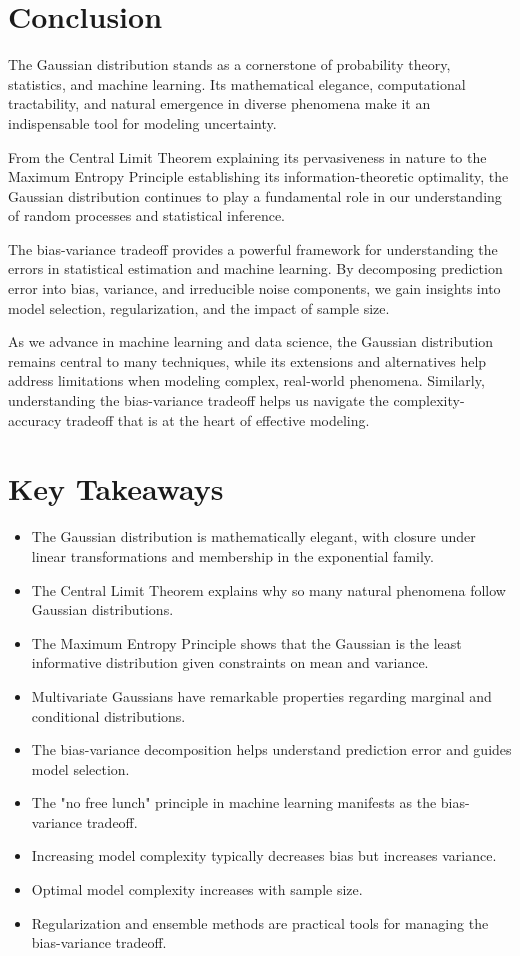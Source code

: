 \documentclass{article}
\begin{document}
\section{Conclusion}

The Gaussian distribution stands as a cornerstone of probability theory, statistics, and machine learning. Its mathematical elegance, computational tractability, and natural emergence in diverse phenomena make it an indispensable tool for modeling uncertainty.

From the Central Limit Theorem explaining its pervasiveness in nature to the Maximum Entropy Principle establishing its information-theoretic optimality, the Gaussian distribution continues to play a fundamental role in our understanding of random processes and statistical inference.

The bias-variance tradeoff provides a powerful framework for understanding the errors in statistical estimation and machine learning. By decomposing prediction error into bias, variance, and irreducible noise components, we gain insights into model selection, regularization, and the impact of sample size.

As we advance in machine learning and data science, the Gaussian distribution remains central to many techniques, while its extensions and alternatives help address limitations when modeling complex, real-world phenomena. Similarly, understanding the bias-variance tradeoff helps us navigate the complexity-accuracy tradeoff that is at the heart of effective modeling.

\section*{Key Takeaways}

\begin{itemize}
\item The Gaussian distribution is mathematically elegant, with closure under linear transformations and membership in the exponential family.
\item The Central Limit Theorem explains why so many natural phenomena follow Gaussian distributions.
\item The Maximum Entropy Principle shows that the Gaussian is the least informative distribution given constraints on mean and variance.
\item Multivariate Gaussians have remarkable properties regarding marginal and conditional distributions.
\item The bias-variance decomposition helps understand prediction error and guides model selection.
\item The "no free lunch" principle in machine learning manifests as the bias-variance tradeoff.
\item Increasing model complexity typically decreases bias but increases variance.
\item Optimal model complexity increases with sample size.
\item Regularization and ensemble methods are practical tools for managing the bias-variance tradeoff.
\end{itemize}
\end{document}
